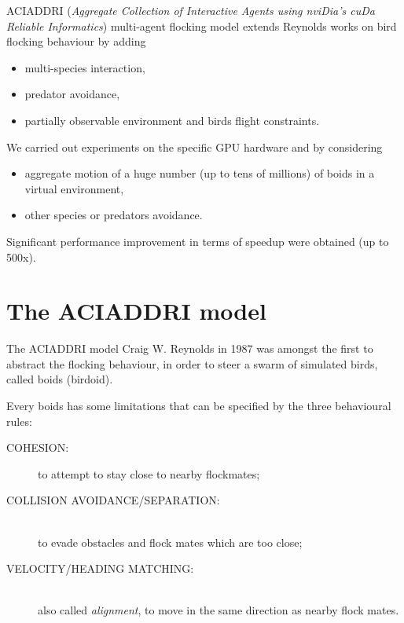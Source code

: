 \documentclass{beamer}
\begin{document}
\begin{frame}

ACIADDRI (\textit{Aggregate
Collection of Interactive Agents using nviDia's cuDa Reliable
Informatics}) multi-agent flocking model extends Reynolds works on bird flocking behaviour by adding 
\begin{itemize}
\item multi-species interaction,
\item  predator avoidance,
\item partially observable environment and birds flight constraints.
\end{itemize}
We carried out experiments on the specific GPU hardware
and by considering 
\begin{itemize}
\item aggregate motion of a huge number
(up to tens of millions) of boids in a virtual environment, 
\item other species or predators avoidance. 
\end{itemize}
Significant performance
improvement in terms of speedup were obtained (up to 500x).
\end{frame}

\section{The ACIADDRI model}
\begin{frame}{The ACIADDRI model}
Craig W. Reynolds in 1987  was amongst
the first to abstract the flocking behaviour, in order to steer a swarm
of simulated birds, called boids (birdoid).

Every boids has some limitations that can be specified by the three behavioural rules:
\begin{description}
\item[COHESION: ] to attempt to stay close to nearby flockmates;
\item[COLLISION AVOIDANCE/SEPARATION: ] \hfill \\ 
to evade obstacles and flock mates which are too
close;
\item[VELOCITY/HEADING MATCHING:]\hfill \\
also called \textit{alignment}, to move in the same direction
as nearby flock mates.
\end{description}
\end{frame}
\end{document}
